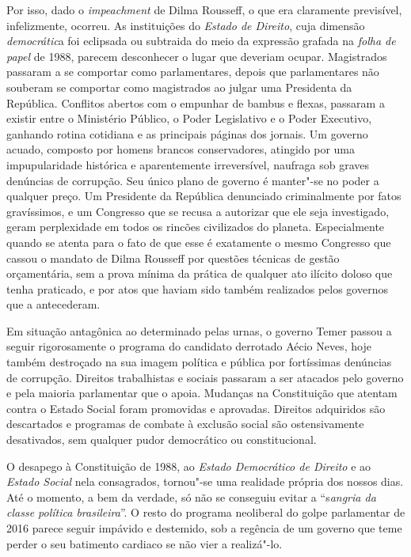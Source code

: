 Por isso, dado o \emph{impeachment} de Dilma Rousseff, o que era
claramente previsível, infelizmente, ocorreu. As instituições do
\emph{Estado de Direito}, cuja dimensão \emph{democrátic}a foi eclipsada
ou subtraida do meio da expressão grafada na \emph{folha de papel} de
1988, parecem desconhecer o lugar que deveriam ocupar. Magistrados
passaram a se comportar como parlamentares, depois que parlamentares não
souberam se comportar como magistrados ao julgar uma Presidenta da
República. Conflitos abertos com o empunhar de bambus e flexas, passaram
a existir entre o Ministério Público, o Poder Legislativo e o Poder
Executivo, ganhando rotina cotidiana e as principais páginas dos
jornais. Um governo acuado, composto por homens brancos conservadores,
atingido por uma impupularidade histórica e aparentemente irreversível,
naufraga sob graves denúncias de corrupção. Seu único plano de governo é
manter"-se no poder a qualquer preço. Um Presidente da República
denunciado criminalmente por fatos gravíssimos, e um Congresso que se
recusa a autorizar que ele seja investigado, geram perplexidade em todos
os rincões civilizados do planeta. Especialmente quando se atenta para o
fato de que esse é exatamente o mesmo Congresso que cassou o mandato de
Dilma Rousseff por questões técnicas de gestão orçamentária, sem a prova
mínima da prática de qualquer ato ilícito doloso que tenha praticado, e
por atos que haviam sido também realizados pelos governos que a
antecederam.

Em situação antagônica ao determinado pelas urnas, o governo Temer
passou a seguir rigorosamente o programa do candidato derrotado Aécio
Neves, hoje também destroçado na sua imagem política e pública por
fortíssimas denúncias de corrupção. Direitos trabalhistas e sociais
passaram a ser atacados pelo governo e pela maioria parlamentar que o
apoia. Mudanças na Constituição que atentam contra o Estado Social foram
promovidas e aprovadas. Direitos adquiridos são descartados e programas
de combate à exclusão social são ostensivamente desativados, sem
qualquer pudor democrático ou constitucional.

O desapego à Constituição de 1988, ao \emph{Estado Democrático de
Direito} e ao \emph{Estado Social} nela consagrados, tornou"-se uma
realidade própria dos nossos dias. Até o momento, a bem da verdade, só
não se conseguiu evitar a ``s\emph{angria da classe política
brasileira}''. O resto do programa neoliberal do golpe parlamentar de
2016 parece seguir impávido e destemido, sob a regência de um governo
que teme perder o seu batimento cardiaco se não vier a realizá"-lo.

